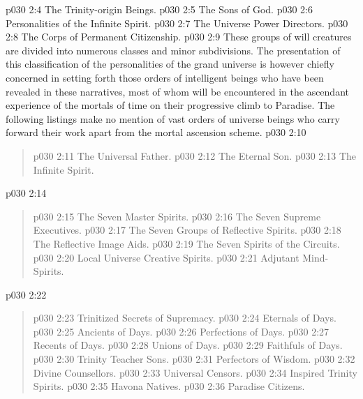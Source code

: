 \vs p030 2:4 \bibnobreakspace The Trinity\hyp{}origin Beings.
\vs p030 2:5 \bibnobreakspace The Sons of God.
\vs p030 2:6 \bibnobreakspace Personalities of the Infinite Spirit.
\vs p030 2:7 \bibnobreakspace The Universe Power Directors.
\vs p030 2:8 \bibnobreakspace The Corps of Permanent Citizenship.
\vs p030 2:9 \pc These groups of will creatures are divided into numerous classes and minor subdivisions. The presentation of this classification of the personalities of the grand universe is however chiefly concerned in setting forth those orders of intelligent beings who have been revealed in these narratives, most of whom will be encountered in the ascendant experience of the mortals of time on their progressive climb to Paradise. The following listings make no mention of vast orders of universe beings who carry forward their work apart from the mortal ascension scheme.
\vsetspace
\vs p030 2:10 \bibnobreakspace {}
\begin{quote}
\vs p030 2:11 \bibnobreakspace The Universal Father.
\vs p030 2:12 \bibnobreakspace The Eternal Son.
\vs p030 2:13 \bibnobreakspace The Infinite Spirit.
\end{quote}
\vsetspace
\vs p030 2:14 \bibnobreakspace {}
\begin{quote}
\vs p030 2:15 \bibnobreakspace The Seven Master Spirits.
\vs p030 2:16 \bibnobreakspace The Seven Supreme Executives.
\vs p030 2:17 \bibnobreakspace The Seven Groups of Reflective Spirits.
\vs p030 2:18 \bibnobreakspace The Reflective Image Aids.
\vs p030 2:19 \bibnobreakspace The Seven Spirits of the Circuits.
\vs p030 2:20 \bibnobreakspace Local Universe Creative Spirits.
\vs p030 2:21 \bibnobreakspace Adjutant Mind\hyp{}Spirits.
\end{quote}
\vsetspace
\vs p030 2:22 \bibnobreakspace {}
\begin{quote}
\vs p030 2:23 \bibnobreakspace Trinitized Secrets of Supremacy.
\vs p030 2:24 \bibnobreakspace Eternals of Days.
\vs p030 2:25 \bibnobreakspace Ancients of Days.
\vs p030 2:26 \bibnobreakspace Perfections of Days.
\vs p030 2:27 \bibnobreakspace Recents of Days.
\vs p030 2:28 \bibnobreakspace Unions of Days.
\vs p030 2:29 \bibnobreakspace Faithfuls of Days.
\vs p030 2:30 \bibnobreakspace Trinity Teacher Sons.
\vs p030 2:31 \bibnobreakspace Perfectors of Wisdom.
\vs p030 2:32 \bibnobreakspace Divine Counsellors.
\vs p030 2:33 \bibnobreakspace Universal Censors.
\vs p030 2:34 \bibnobreakspace Inspired Trinity Spirits.
\vs p030 2:35 \bibnobreakspace Havona Natives.
\vs p030 2:36 \bibnobreakspace Paradise Citizens.
\end{quote}
